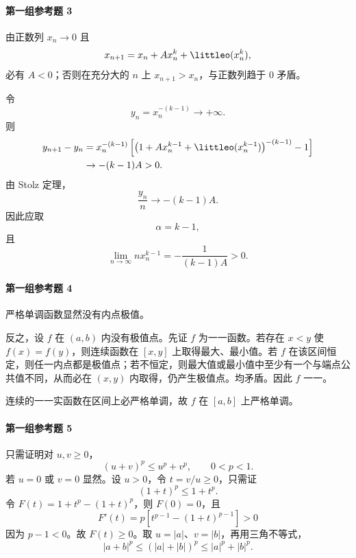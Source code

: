 \paragraph{第一组参考题 3}
\begin{xsolution}
由正数列 $x_n\to0$ 且
\[
  x_{n+1}=x_n+Ax_n^k+\littleo(x_n^k),
\]
必有 $A<0$；否则在充分大的 $n$ 上 $x_{n+1}>x_n$，与正数列趋于 0 矛盾。

令
\[
  y_n=x_n^{-(k-1)}\to+\infty.
\]
则
\begin{align*}
  y_{n+1}-y_n
  &=x_n^{-(k-1)}
  \left[
    \left(1+Ax_n^{k-1}+\littleo(x_n^{k-1})\right)^{-(k-1)}-1
  \right]\\
  &\to-(k-1)A>0.
\end{align*}
由 Stolz 定理，
\[
  \frac{y_n}{n}\to-(k-1)A.
\]
因此应取
\[
  \boxed{\alpha=k-1},
\]
且
\[
  \boxed{\lim_{n\to\infty}n x_n^{k-1}
  =-\frac1{(k-1)A}>0}.
\]
\end{xsolution}

\paragraph{第一组参考题 4}
\begin{xsolution}
严格单调函数显然没有内点极值。

反之，设 $f$ 在 $(a,b)$ 内没有极值点。先证 $f$ 为一一函数。若存在 $x<y$ 使 $f(x)=f(y)$，则连续函数在 $[x,y]$ 上取得最大、最小值。若 $f$ 在该区间恒定，则任一内点都是极值点；若不恒定，则最大值或最小值中至少有一个与端点公共值不同，从而必在 $(x,y)$ 内取得，仍产生极值点。均矛盾。因此 $f$ 一一。

连续的一一实函数在区间上必严格单调，故 $f$ 在 $[a,b]$ 上严格单调。
\end{xsolution}

\paragraph{第一组参考题 5}
\begin{xsolution}
只需证明对 $u,v\ge0$，
\[
  (u+v)^p\le u^p+v^p,
  \qquad0<p<1.
\]
若 $u=0$ 或 $v=0$ 显然。设 $u>0$，令 $t=v/u\ge0$，只需证
\[
  (1+t)^p\le1+t^p.
\]
令 $F(t)=1+t^p-(1+t)^p$，则 $F(0)=0$，且
\[
  F'(t)=p[t^{p-1}-(1+t)^{p-1}]>0
\]
因为 $p-1<0$。故 $F(t)\ge0$。取 $u=|a|$、$v=|b|$，再用三角不等式，
\[
  |a+b|^p\le(|a|+|b|)^p\le|a|^p+|b|^p.
\]
\end{xsolution}

